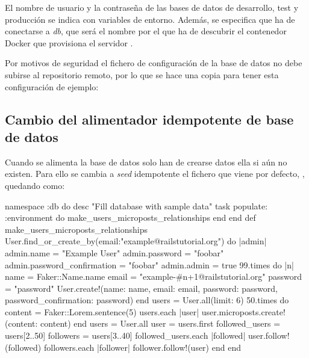 El nombre de usuario y la contraseña de las bases de datos de desarrollo, test y producción se indica con variables de entorno. Además, se especifica que ha de conectarse a \textit{db}, que será el nombre por el que ha de descubrir el contenedor Docker que provisiona el servidor .

Por motivos de seguridad el fichero de configuración de la base de datos no debe subirse al repositorio remoto, por lo que se hace una copia para tener esta configuración de ejemplo:


\subsection{Cambio del alimentador idempotente de base de datos}

Cuando se alimenta la base de datos solo han de crearse datos ella si aún no existen. Para ello se cambia a \textit{seed} idempotente el fichero que viene por defecto, , quedando como:

\begin{codelisting}
\label{code:idempotentseed}
\begin{code}
namespace :db do
  desc "Fill database with sample data"
  task populate: :environment do
    make_users_microposts_relationships
  end
end
def make_users_microposts_relationships
  User.find_or_create_by(email:"example@railstutorial.org") do |admin|
  	admin.name = "Example User"
	admin.password = "foobar"
        admin.password_confirmation = "foobar"
        admin.admin = true
	99.times do |n|
	    name  = Faker::Name.name
	    email = "example-#{n+1}@railstutorial.org"
	    password  = "password"
	    User.create!(name:     name,
                 email:    email,
                 password: password,
                 password_confirmation: password)
        end
	users = User.all(limit: 6)
  	50.times do
	    content = Faker::Lorem.sentence(5)
	    users.each { |user| user.microposts.create!(content: content) }
	end  
	users = User.all
	user  = users.first
	followed_users = users[2..50]
	followers      = users[3..40]
	followed_users.each { |followed| user.follow!(followed) }
	followers.each      { |follower| follower.follow!(user) }
  end
end
\end{code}
\end{codelisting}

